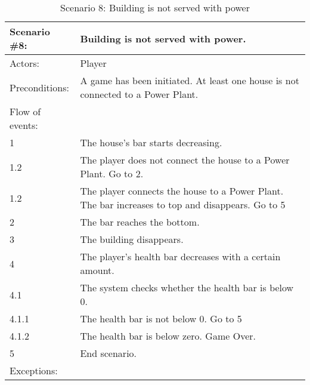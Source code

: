 \begin{table}
	\begin{tabular}{| l | p{10cm} |}
		\hline
		\rowcolor{lightgray}
		{\bf Scenario \#8:} & {\bf Building is not served with power.} \\ \hline
		Actors: & Player \\ \hline
		Preconditions: & A game has been initiated. At least one house is not connected to a Power Plant. \\ \hline
		\rowcolor{lightergray}
		Flow of events: & \\ \hline
		1 & The house's bar starts decreasing. \\ \hline
		1.2 & The player does not connect the house to a Power Plant. Go to 2. \\ \hline
		1.2 & The player connects the house to a Power Plant. The bar increases to top and disappears. Go to 5 \\ \hline
		2 & The bar reaches the bottom. \\ \hline
		3 & The building disappears. \\ \hline
		4 & The player's health bar decreases with a certain amount. \\ \hline
		4.1 & The system checks whether the health bar is below 0. \\ \hline
		4.1.1 & The health bar is not below 0. Go to 5 \\ \hline
		4.1.2 & The health bar is below zero. Game Over. \\ \hline
		5 & End scenario. \\ \hline
		\rowcolor{lightergray}
		Exceptions: & \\ \hline	
	\end{tabular}
	\caption{Scenario 8: Building is not served with power}
\end{table}


